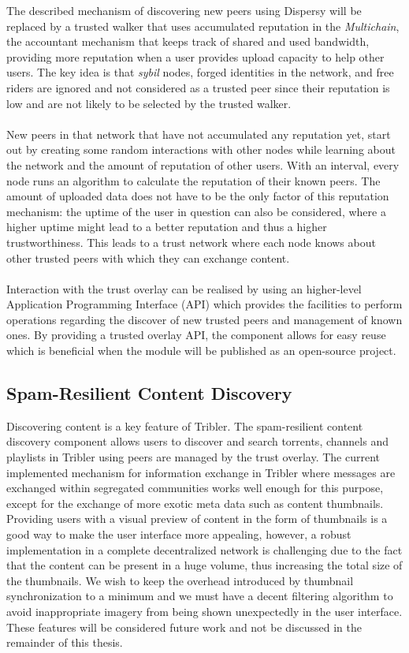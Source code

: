 The described mechanism of discovering new peers using Dispersy will be replaced by a trusted walker that uses accumulated reputation in the \emph{Multichain}, the accountant mechanism that keeps track of shared and used bandwidth, providing more reputation when a user provides upload capacity to help other users. The key idea is that \emph{sybil} nodes, forged identities in the network, and free riders are ignored and not considered as a trusted peer since their reputation is low and are not likely to be selected by the trusted walker.\\\\
New peers in that network that have not accumulated any reputation yet, start out by creating some random interactions with other nodes while learning about the network and the amount of reputation of other users. With an interval, every node runs an algorithm to calculate the reputation of their known peers. The amount of uploaded data does not have to be the only factor of this reputation mechanism: the uptime of the user in question can also be considered, where a higher uptime might lead to a better reputation and thus a higher trustworthiness. This leads to a trust network where each node knows about other trusted peers with which they can exchange content.\\\\
Interaction with the trust overlay can be realised by using an higher-level Application Programming Interface (API) which provides the facilities to perform operations regarding the discover of new trusted peers and management of known ones. By providing a trusted overlay API, the component allows for easy reuse which is beneficial when the module will be published as an open-source project.

\subsection{Spam-Resilient Content Discovery}
Discovering content is a key feature of Tribler. The spam-resilient content discovery component allows users to discover and search torrents, channels and playlists in Tribler using peers are managed by the trust overlay. The current implemented mechanism for information exchange in Tribler where messages are exchanged within segregated communities works well enough for this purpose, except for the exchange of more exotic  meta data such as content thumbnails. Providing users with a visual preview of content in the form of thumbnails is a good way to make the user interface more appealing, however, a robust implementation in a complete decentralized network is challenging due to the fact that the content can be present in a huge volume, thus increasing the total size of the thumbnails. We wish to keep the overhead introduced by thumbnail synchronization to a minimum and we must have a decent filtering algorithm to avoid inappropriate imagery from being shown unexpectedly in the user interface. These features will be considered future work and not be discussed in the remainder of this thesis.

